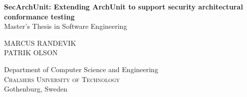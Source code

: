 
\begin{titlepage}
			
\addtolength{\voffset}{2cm}


\mbox{}
\vfill
\renewcommand{\familydefault}{\sfdefault} \normalfont %
\textbf{{\Huge 	SecArchUnit: Extending ArchUnit to support 
				security architectural conformance testing}} 	\\[0.5cm]
Master's Thesis in Software Engineering \setlength{\parskip}{1cm}

{\Large MARCUS RANDEVIK \\[0.2cm]
        PATRIK OLSON} \setlength{\parskip}{2.9cm}

Department of Computer Science and Engineering \\
\textsc{Chalmers University of Technology} \\
Gothenburg, Sweden \the\year

\renewcommand{\familydefault}{\rmdefault} \normalfont %
\end{titlepage}


\newpage
\restoregeometry
\thispagestyle{empty}
\mbox{}



